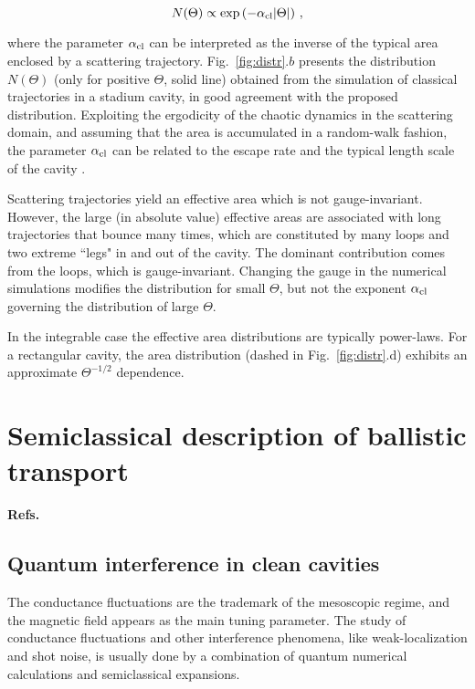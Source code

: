 \documentclass[a4paper,10pt]{article}
\newcommand{\nin}{\noindent}
\newcommand{\be}{\begin{equation}}
\newcommand{\ee}{\end{equation}}
\newcommand{\alc}{\alpha_{\rm cl}}
\begin{document}
\be
N(\Theta) \propto \exp{(-\alc |\Theta|)} \ ,
\label{eq:efardis}
\ee

\nin where the parameter $\alc$ can be interpreted as the inverse of the
typical area enclosed by a scattering trajectory. Fig.~\ref{fig:distr}.$b$ presents the distribution $N(\Theta)$ (only for positive $\Theta$, solid line) obtained from the simulation of classical trajectories in a stadium cavity, in good agreement with the proposed distribution.
Exploiting the ergodicity of the chaotic dynamics in the scattering domain, and assuming that the area is accumulated in a random-walk fashion, the parameter $\alc$ can be related to the escape rate and the typical length scale of the cavity \cite{Jen91,Dor91}. 

\nin Scattering trajectories yield an effective area which is not
gauge-invariant. However, the large (in absolute value) 
effective areas are associated with long trajectories that
bounce many times, which are constituted by many loops
and two extreme ``legs" in and out of the cavity. The dominant
contribution comes from the loops, which is gauge-invariant. Changing the gauge in the numerical simulations modifies the distribution for small $\Theta$, but not the exponent $\alc$ governing the
distribution of large $\Theta$.

\nin In the integrable case the effective area distributions are typically power-laws. For a rectangular cavity, the area distribution (dashed in Fig.~\ref{fig:distr}.d) exhibits an approximate $\Theta^{-1/2}$
dependence.

\section{Semiclassical description of ballistic transport}
\label{sec:sdqttbc}

{\bf Refs.~\cite{Chaost,revha,LesHouSt,csf,jalabert00}}

\subsection{Quantum interference in clean cavities}
\label{sub:qibc}

The conductance fluctuations are the trademark of the mesoscopic regime, and the magnetic field appears as the main tuning parameter. The study of conductance fluctuations and other interference phenomena, like weak-localization and shot noise, is usually done by a combination of quantum numerical calculations and semiclassical expansions. 
\end{document}
